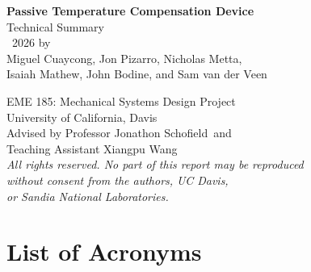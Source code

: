 \documentclass[12pt, letterpaper]{report}%
\newcommand{\instructor}{Professor Jonathon Schofield}
\newcommand{\ta}{Teaching Assistant Xiangpu Wang}
\begin{document}
\begin{center}

	{\large\bfseries Passive Temperature Compensation Device}\\[6pt]
	{\large Technical Summary}\\[24pt]

	\textcopyright\ 2026 by\\[6pt]
	Miguel Cuaycong, Jon Pizarro, Nicholas Metta,\\
	Isaiah Mathew, John Bodine, and Sam van der Veen\\[24pt]

	{\small
	
	EME 185: Mechanical Systems Design Project\\
	University of California, Davis\\[12pt]

	Advised by \instructor\ and\\
	\ta\\[24pt]

	\textit{All rights reserved. No part of this report may be reproduced}\\
	\textit{without consent from the authors, UC Davis,}\\
	\textit{or Sandia National Laboratories.}\\[24pt]

	}

\end{center}

\vspace*{\fill}

\newpage

\chapter*{\large{List of Acronyms}}
\end{document}
